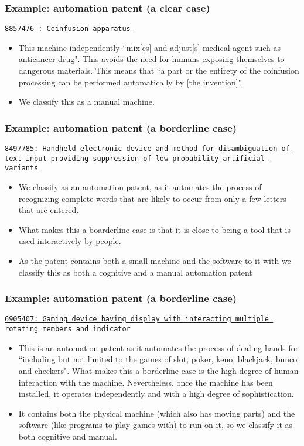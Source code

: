 \documentclass[10pt]{beamer}
\begin{document}
\begin{frame}\frametitle{Example: automation patent (a clear case)}
\href{https://www.google.de/patents/US8857476}{\texttt{8857476 : Coinfusion apparatus }}
	\begin{itemize}	
	\item This machine independently ``mix[es] and adjust[s] medical agent such as anticancer drug". This avoids the need for humans exposing themselves to dangerous materials. This means that  ``a part or the entirety of the coinfusion processing can be performed automatically by [the invention]".
	\item We classify this as a manual machine.
	\end{itemize}
\end{frame}


\begin{frame}\frametitle{Example: automation patent (a borderline case)}
\href{https://www.google.de/patents/US8497785}{\texttt{8497785: Handheld electronic device and method for disambiguation of text input providing suppression of low probability artificial variants}}
	\begin{itemize}	
	\item We classify as an automation patent, as it automates the process of recognizing complete words that are likely to occur from only a few letters that are entered.
	\item What makes this a boarderline case is that it is close to being a tool that is used interactively by people.
	\item As the patent contains both a small machine and the software to it with we classify this as both a cognitive and a manual automation patent
	\end{itemize}
\end{frame}


\begin{frame}\frametitle{Example: automation patent (a borderline case)}
\href{https://www.google.de/patents/US6905407}{\texttt{6905407: Gaming device having display with interacting multiple rotating members and indicator}}
	\begin{itemize}	
	\item This is an automation patent as it automates the process of dealing hands for ``including but not limited to the games of slot, poker, keno, blackjack, bunco and checkers". What makes this a borderline case is the high degree of human interaction with the machine. Nevertheless, once the machine has been installed, it operates independently and with a high degree of sophistication.
	\item It contains both the physical machine (which also has moving parts) and the software (like programs to play games with) to run on it, so we classify it as both cognitive and manual.
	\end{itemize}
\end{frame}
\end{document}
